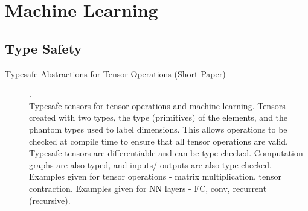 \chapter {Machine Learning}

\section {Type Safety}

\begin{description}
  \item[\href{https://arxiv.org/abs/1710.06892}{Typesafe Abstractions for Tensor Operations (Short Paper)}] {\cite{chen2017typesafe}.
    \\ Typesafe tensors for tensor operations and machine learning. Tensors created with two types, the type (primitives) of the elements, and the phantom types used to label dimensions. This allows operations to be checked at compile time to ensure that all tensor operations are valid. Typesafe tensors are differentiable and can be type-checked. Computation graphs are also typed, and inputs/ outputs are also type-checked. Examples given for tensor operations - matrix multiplication, tensor contraction. Examples given for NN layers - FC, conv, recurrent (recursive).}
\end{description}
